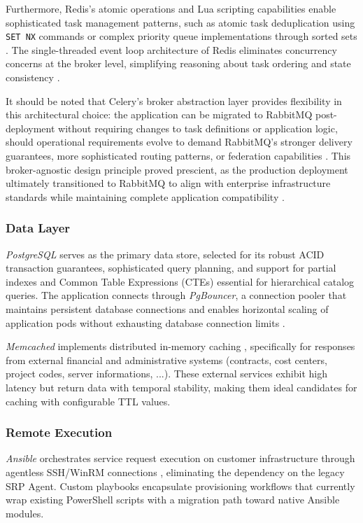 Furthermore, Redis's atomic operations and Lua scripting capabilities enable sophisticated task management patterns, such as atomic task deduplication using \texttt{SET NX} commands or complex priority queue implementations through sorted sets \cite{carlson2013redis}. The single-threaded event loop architecture of Redis eliminates concurrency concerns at the broker level, simplifying reasoning about task ordering and state consistency \cite{carlson2013redis}.

It should be noted that Celery's broker abstraction layer provides flexibility in this architectural choice: the application can be migrated to RabbitMQ post-deployment without requiring changes to task definitions or application logic, should operational requirements evolve to demand RabbitMQ's stronger delivery guarantees, more sophisticated routing patterns, or federation capabilities \cite{celery}. This broker-agnostic design principle proved prescient, as the production deployment ultimately transitioned to RabbitMQ to align with enterprise infrastructure standards while maintaining complete application compatibility \cite{celery}.
\subsubsection{Data Layer}

\textit{PostgreSQL} serves as the primary data store, selected for its robust ACID transaction guarantees, sophisticated query planning, and support for partial indexes and Common Table Expressions (CTEs) essential for hierarchical catalog queries. The application connects through \textit{PgBouncer}, a connection pooler that maintains persistent database connections and enables horizontal scaling of application pods without exhausting database connection limits \cite{pgbouncer}.

\textit{Memcached} implements distributed in-memory caching \cite{memcached}, specifically for responses from external financial and administrative systems (contracts, cost centers, project codes, server informations, ...). These external services exhibit high latency but return data with temporal stability, making them ideal candidates for caching with configurable TTL values.

\subsubsection{Remote Execution}

\textit{Ansible} orchestrates service request execution on customer infrastructure through agentless SSH/WinRM connections \cite{ansible}, eliminating the dependency on the legacy SRP Agent. Custom playbooks encapsulate provisioning workflows that currently wrap existing PowerShell scripts with a migration path toward native Ansible modules.

